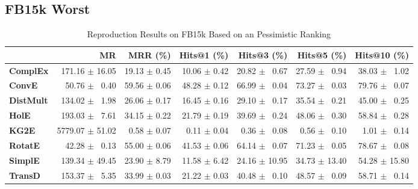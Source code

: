 \documentclass[journal]{IEEEtran}
\begin{document}
\subsection{FB15k Worst}
    \begin{table*}
        \caption{Reproduction Results on FB15k Based on an Pessimistic Ranking}
        \label{tab:fb15k_full_results_pessimistic_ranking}
        \centering
        \begin{tabular}{lrrrrrr}
\toprule
{} &               MR &      MRR (\%) &   Hits@1 (\%) &    Hits@3 (\%) &    Hits@5 (\%) &   Hits@10 (\%) \\
\midrule
\textbf{ComplEx } &  $\phantom{5}$171.16 $\pm$ 16.05 &  19.13 $\pm$ 0.45 &  10.06 $\pm$ 0.42 &  20.82 $\pm$ $\phantom{5}$0.67 &  27.59 $\pm$ $\phantom{5}$0.94 &  38.03 $\pm$ $\phantom{5}$1.02 \\
\textbf{ConvE   } &  $\phantom{5}$$\phantom{5}$50.76 $\pm$ $\phantom{5}$0.40 &  59.56 $\pm$ 0.06 &  48.28 $\pm$ 0.12 &  66.99 $\pm$ $\phantom{5}$0.04 &  73.27 $\pm$ $\phantom{5}$0.03 &  79.76 $\pm$ $\phantom{5}$0.07 \\
\textbf{DistMult} &  $\phantom{5}$134.02 $\pm$ $\phantom{5}$1.98 &  26.06 $\pm$ 0.17 &  16.45 $\pm$ 0.16 &  29.10 $\pm$ $\phantom{5}$0.17 &  35.54 $\pm$ $\phantom{5}$0.21 &  45.00 $\pm$ $\phantom{5}$0.25 \\
\textbf{HolE    } &  $\phantom{5}$193.03 $\pm$ $\phantom{5}$7.61 &  34.15 $\pm$ 0.22 &  21.79 $\pm$ 0.19 &  39.69 $\pm$ $\phantom{5}$0.24 &  48.06 $\pm$ $\phantom{5}$0.30 &  58.84 $\pm$ $\phantom{5}$0.28 \\
\textbf{KG2E    } &  5779.07 $\pm$ 51.02 &  $\phantom{5}$0.58 $\pm$ 0.07 &  $\phantom{5}$0.11 $\pm$ 0.04 &  $\phantom{5}$0.36 $\pm$ $\phantom{5}$0.08 &  $\phantom{5}$0.56 $\pm$ $\phantom{5}$0.10 &  $\phantom{5}$1.01 $\pm$ $\phantom{5}$0.14 \\
\textbf{RotatE  } &  $\phantom{5}$$\phantom{5}$42.28 $\pm$ $\phantom{5}$0.13 &  55.00 $\pm$ 0.06 &  41.53 $\pm$ 0.06 &  64.14 $\pm$ $\phantom{5}$0.07 &  71.23 $\pm$ $\phantom{5}$0.05 &  78.67 $\pm$ $\phantom{5}$0.08 \\
\textbf{SimplE  } &  $\phantom{5}$139.34 $\pm$ 49.45 &  23.90 $\pm$ 8.79 &  11.58 $\pm$ 6.42 &  24.16 $\pm$ 10.95 &  34.73 $\pm$ 13.40 &  54.28 $\pm$ 15.80 \\
\textbf{TransD  } &  $\phantom{5}$153.37 $\pm$ $\phantom{5}$5.35 &  33.99 $\pm$ 0.03 &  21.22 $\pm$ 0.03 &  40.48 $\pm$ $\phantom{5}$0.10 &  48.57 $\pm$ $\phantom{5}$0.09 &  58.71 $\pm$ $\phantom{5}$0.14 \\

\end{tabular}
\end{table*}
\end{document}

